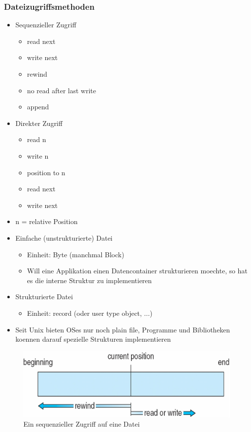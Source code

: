 \documentclass[a4paper]{scrreprt}
\begin{document}
\subsubsection{Dateizugriffsmethoden}
\begin{itemize}
	\item Sequenzieller Zugriff
		\begin{itemize}
			\item read next
			\item write next
			\item rewind
			\item no read after last write
			\item append
		\end{itemize}
	\item Direkter Zugriff
		\begin{itemize}
			\item read n
			\item write n
			\item position to n
			\item read next
			\item write next
		\end{itemize}
	\item n = relative Position
	\item Einfache (unstrukturierte) Datei
		\begin{itemize}
			\item Einheit: Byte (manchmal Block)
			\item Will eine Applikation einen Datencontainer strukturieren moechte, so hat es die interne Struktur zu implementieren
		\end{itemize}
	\item Strukturierte Datei
		\begin{itemize}
			\item Einheit: record (oder user type object, ...)
		\end{itemize}
	\item Seit Unix bieten OSes nur noch plain file, Programme und Bibliotheken koennen darauf spezielle Strukturen implementieren
\end{itemize}

\begin{figure}[ht]
\centering
\includegraphics[scale=0.4]{sequential_access.png}
\caption{Ein sequenzieller Zugriff auf eine Datei}
\end{figure}
\end{document}
